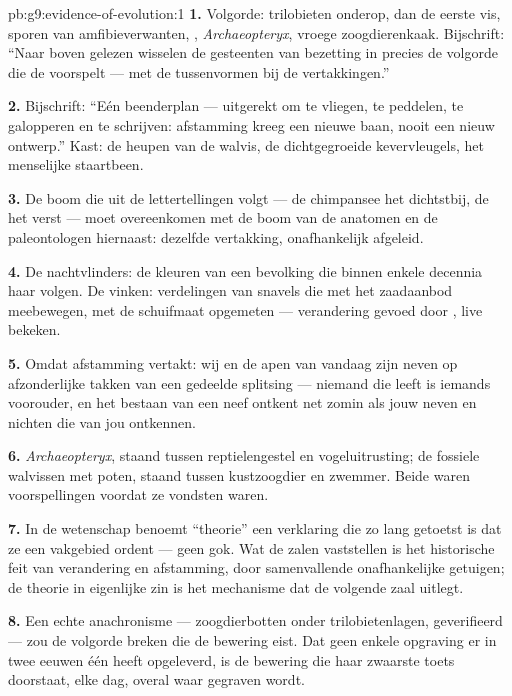 \begin{solution}{pb:g9:evidence-of-evolution:1}
\textbf{1.} Volgorde: trilobieten onderop, dan de eerste vis, sporen
van amfibieverwanten, , \emph{Archaeopteryx}, vroege
zoogdierenkaak. Bijschrift: ``Naar boven gelezen wisselen de
gesteenten van bezetting in precies de volgorde die de 
voorspelt --- met de tussenvormen bij de vertakkingen.''

\textbf{2.} Bijschrift: ``Eén beenderplan --- uitgerekt om te
vliegen, te peddelen, te galopperen en te schrijven: afstamming
kreeg een nieuwe baan, nooit een nieuw ontwerp.'' Kast: de heupen
van de walvis, de dichtgegroeide kevervleugels, het menselijke
staartbeen.

\textbf{3.} De boom die uit de lettertellingen volgt --- de
chimpansee het dichtstbij, de  het verst --- moet overeenkomen
met de boom van de anatomen en de paleontologen hiernaast: dezelfde
vertakking, onafhankelijk afgeleid.

\textbf{4.} De nachtvlinders: de kleuren van een bevolking die
binnen enkele decennia haar  volgen. De vinken: verdelingen
van snavels die met het zaadaanbod meebewegen, met de schuifmaat
opgemeten --- verandering gevoed door , live bekeken.

\textbf{5.} Omdat afstamming vertakt: wij en de apen van vandaag
zijn neven op afzonderlijke takken van een gedeelde splitsing ---
niemand die leeft is iemands voorouder, en het bestaan van een neef
ontkent  net zomin als jouw neven en nichten die van
jou ontkennen.

\textbf{6.} \emph{Archaeopteryx}, staand tussen reptielengestel en
vogeluitrusting; de fossiele walvissen met poten, staand tussen
kustzoogdier en zwemmer. Beide waren voorspellingen voordat ze
vondsten waren.

\textbf{7.} In de wetenschap benoemt ``theorie'' een verklaring die
zo lang getoetst is dat ze een vakgebied ordent --- geen gok. Wat
de zalen vaststellen is het historische feit van verandering en
afstamming, door samenvallende onafhankelijke getuigen; de theorie
in eigenlijke zin is het mechanisme dat de volgende zaal uitlegt.

\textbf{8.} Een echte anachronisme --- zoogdierbotten onder
trilobietenlagen, geverifieerd --- zou de volgorde breken die de
bewering eist. Dat geen enkele opgraving er in twee eeuwen één heeft
opgeleverd, is de bewering die haar zwaarste toets doorstaat, elke
dag, overal waar gegraven wordt.


\end{solution}
